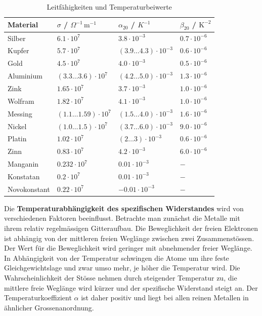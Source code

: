 \begin{table}[H]
\centering
\begin{tabular}{llll}
\hline
Material&$\sigma$ / $\Omega^{-1}\,\text{m}^{-1}$&$\alpha_{20}$ / $K^{-1}$&$\beta_{20}$ / $\text{K}^{-2}$\\\hline
Silber&$6.1\cdot 10^7$&$3.8\cdot 10^{-3}$&$0.7\cdot 10^{-6}$\\
Kupfer&$5.7\cdot 10^7$&$\left(3.9\dotso 4.3\right)\cdot 10^{-3}$&$0.6\cdot 10^{-6}$\\
Gold&$4.5\cdot 10^7$&$4.0\cdot 10^{-3}$&$0.5\cdot 10^{-6}$\\
Aluminium&$\left(3.3\dotso 3.6\right)\cdot 10^7$&$\left(4.2\dotso 5.0\right)\cdot 10^{-3}$&$1.3\cdot 10^{-6}$\\
Zink&$1.65\cdot 10^7$&$3.7\cdot 10^{-3}$&$1.0\cdot 10^{-6}$\\
Wolfram&$1.82\cdot 10^7$&$4.1\cdot 10^{-3}$&$1.0\cdot 10^{-6}$\\
Messing&$\left(1.1\dotso 1.59\right)\cdot 10^7$&$\left(1.5\dotso 4.0\right)\cdot 10^{-3}$&$1.6\cdot 10^{-6}$\\
Nickel&$\left(1.0\dotso 1.5\right)\cdot 10^7$&$\left(3.7\dotso 6.0\right)\cdot 10^{-3}$&$9.0\cdot 10^{-6}$\\
Platin&$1.02\cdot 10^7$&$\left(2\dotso 3\right)\cdot 10^{-3}$&$0.6\cdot 10^{-6}$\\
Zinn&$0.83\cdot 10^7$&$4.2\cdot 10^{-3}$&$6.0\cdot 10^{-6}$\\
Manganin&$0.232\cdot 10^7$&$0.01\cdot 10^{-3}$&$-$\\
Konstatan&$0.2\cdot 10^7$&$0.01\cdot 10^{-3}$&$-$\\
Novokonstant&$0.22\cdot 10^7$&$-0.01\cdot 10^{-3}$&$-$\\\hline
\end{tabular}
\caption{Leitfähigkeiten und Temperaturbeiwerte}
\end{table}
\noindent Die \textbf{Temperaturabhängigkeit des spezifischen Widerstandes} wird von verschiedenen Faktoren beeinflusst. Betrachte man zunächst die Metalle mit ihrem relativ regelmässigen Gitteraufbau. Die Beweglichkeit der freien Elektronen ist abhängig von der mittleren freien Weglänge zwischen zwei Zusammenstössen. Der Wert für die Beweglichkeit wird geringer mit abnehmender freier Weglänge. In Abhängigkeit von der Temperatur schwingen die Atome um ihre feste Gleichgewichtslage und zwar umso mehr, je höher die Temperatur wird.
\newline\newline
Die Wahrscheinlichkeit der Stösse nehmen durch steigender Temperatur zu, die mittlere freie Weglänge wird kürzer und der spezifische Widerstand steigt an. Der Temperaturkoeffizient $\alpha$ ist daher positiv und liegt bei allen reinen Metallen in ähnlicher Grossenanordnung.
